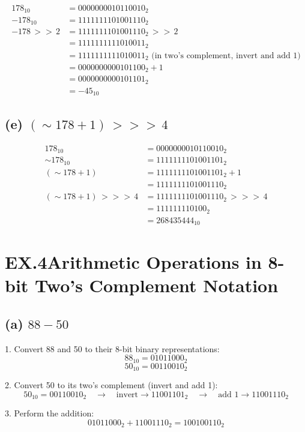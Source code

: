 \documentclass{article}
\begin{document}
\begin{align*}
178_{10} &= 0000000010110010_2 \\
-178_{10} &= 1111111101001110_2 \\
-178 \, >> \, 2 &= 1111111101001110_2 \, >> \, 2 \\
&= 1111111111010011_2 \\
&= 1111111111010011_2 \text{ (in two's complement, invert and add 1)} \\
&= 0000000000101100_2 + 1 \\
&= 0000000000101101_2 \\
&= -45_{10}
\end{align*}

\subsection*{(e) \( ( \sim 178 + 1) \, >>> \, 4 \)}

\begin{align*}
178_{10} &= 0000000010110010_2 \\
\sim 178_{10} &= 1111111101001101_2 \\
(\sim178 + 1) &= 1111111101001101_2 + 1 \\
&= 1111111101001110_2 \\
(\sim 178 + 1) \, >>> \, 4 &= 1111111101001110_2 \, >>> \, 4 \\
&= 111111110100_2 \\
&= 268435444_{10}
\end{align*}

\section*{EX.4Arithmetic Operations in 8-bit Two's Complement Notation}

\subsection*{(a) \(88 - 50\)}

1. Convert 88 and 50 to their 8-bit binary representations:
\[
88_{10} = 01011000_2
\]
\[
50_{10} = 00110010_2
\]

2. Convert 50 to its two's complement (invert and add 1):
\[
50_{10} = 00110010_2 \quad \rightarrow \quad \text{invert} \rightarrow 11001101_2 \quad \rightarrow \quad \text{add 1} \rightarrow 11001110_2
\]

3. Perform the addition:
\[
01011000_2 + 11001110_2 = 100100110_2
\]
\end{document}
